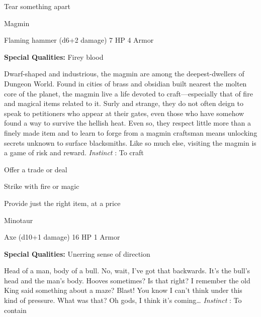 \startitemize[1,packed]
         
\item Tear something apart

       
\stopitemize
       
\startMonsterName
Magmin	 
\stopMonsterName
       

Flaming hammer (d6+2 damage)	7 HP	4 Armor

       


       
\startMonsterQualities
         {\bf Special Qualities:}  Firey blood
\stopMonsterQualities
       
\startMonsterDescription
Dwarf-shaped and industrious, the magmin are among the deepest-dwellers of Dungeon World. Found in cities of brass and obsidian built nearest the molten core of the planet, the magmin live a life devoted to craft—especially that of fire and magical items related to it. Surly and strange, they do not often deign to speak to petitioners who appear at their gates, even those who have somehow found a way to survive the hellish heat. Even so, they respect little more than a finely made item and to learn to forge from a magmin craftsman means unlocking secrets unknown to surface blacksmiths. Like so much else, visiting the magmin is a game of risk and reward. {\em Instinct} : To craft
\stopMonsterDescription
       
\startitemize[1,packed]
         
\item Offer a trade or deal

         
\item Strike with fire or magic

         
\item Provide just the right item, at a price

       
\stopitemize
       
\startMonsterName
Minotaur	 
\stopMonsterName
       

Axe (d10+1 damage)	16 HP	1 Armor

       


       
\startMonsterQualities
         {\bf Special Qualities:}  Unerring sense of direction
\stopMonsterQualities
       
\startMonsterDescription
Head of a man, body of a bull. No, wait, I’ve got that backwards. It’s the bull’s head and the man’s body. Hooves sometimes? Is that right? I remember the old King said something about a maze? Blast! You know I can’t think under this kind of pressure. What was that? Oh gods, I think it’s coming… {\em Instinct} : To contain
\stopMonsterDescription
       
